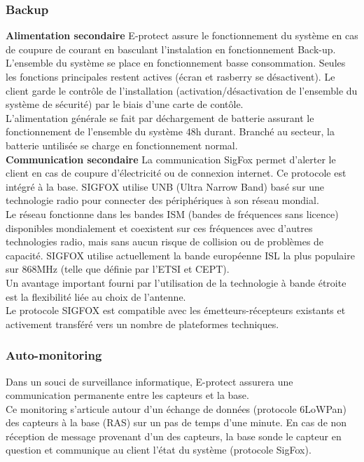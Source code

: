 \subsubsection{Backup}
\textbf{Alimentation secondaire}
E-protect assure le fonctionnement du système en cas de coupure de courant en basculant l'instalation en fonctionnement Back-up.\\
L'ensemble du système se place en fonctionnement basse consommation. Seules les fonctions principales restent actives (écran et rasberry se désactivent). Le client garde le contrôle de l'installation (activation/désactivation de l'ensemble du système de sécurité) par le biais d'une carte de contôle.\\
L'alimentation générale se fait par déchargement de batterie assurant le fonctionnement de l'ensemble du système 48h durant. Branché au secteur, la batterie untilisée se charge en fonctionnement normal.\\
\textbf{Communication secondaire}
La communication SigFox permet d’alerter le client en cas de coupure d’électricité ou de connexion internet. Ce protocole est intégré à la base.
SIGFOX utilise UNB (Ultra Narrow Band) basé sur une technologie radio pour connecter des périphériques à son réseau mondial.\\
Le réseau fonctionne dans les bandes ISM (bandes de fréquences sans licence) disponibles mondialement et coexistent sur ces fréquences avec d'autres technologies radio, mais sans aucun risque de collision ou de problèmes de capacité. SIGFOX utilise actuellement la bande européenne ISL la plus populaire sur 868MHz (telle que définie par l'ETSI et CEPT).\\

Un avantage important fourni par l'utilisation de la technologie à bande étroite est la flexibilité liée au choix de l'antenne.\\

Le protocole SIGFOX est compatible avec les émetteurs-récepteurs existants et activement transféré vers un nombre de plateformes techniques.\\
\cite{www:Sigfox}

\subsubsection{Auto-monitoring}
Dans un souci de surveillance informatique, E-protect assurera une communication permanente entre les capteurs et la base.\\
Ce monitoring s’articule autour d’un échange de données (protocole 6LoWPan) des capteurs à la base (RAS) sur un pas de temps d’une minute. En cas de non réception de message provenant d’un des capteurs, la base sonde le capteur en question et communique au client l’état du système (protocole SigFox).\\

